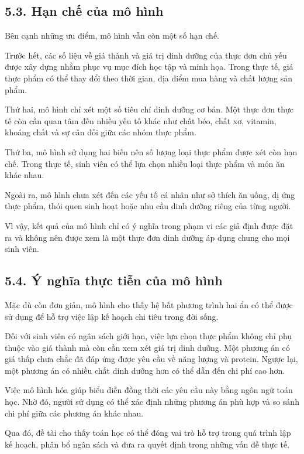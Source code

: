 \documentclass[12pt,a4paper]{article}
\begin{document}
\subsection*{5.3. Hạn chế của mô hình}

Bên cạnh những ưu điểm, mô hình vẫn còn một số hạn chế.

Trước hết, các số liệu về giá thành và giá trị dinh dưỡng của thực đơn
chủ yếu được xây dựng nhằm phục vụ mục đích học tập và minh họa.
Trong thực tế, giá thực phẩm có thể thay đổi theo thời gian, địa điểm
mua hàng và chất lượng sản phẩm.

Thứ hai, mô hình chỉ xét một số tiêu chí dinh dưỡng cơ bản. Một thực
đơn thực tế còn cần quan tâm đến nhiều yếu tố khác như chất béo,
chất xơ, vitamin, khoáng chất và sự cân đối giữa các nhóm thực phẩm.

Thứ ba, mô hình sử dụng hai biến nên số lượng loại thực phẩm được xét
còn hạn chế. Trong thực tế, sinh viên có thể lựa chọn nhiều loại thực
phẩm và món ăn khác nhau.

Ngoài ra, mô hình chưa xét đến các yếu tố cá nhân như sở thích ăn
uống, dị ứng thực phẩm, thói quen sinh hoạt hoặc nhu cầu dinh dưỡng
riêng của từng người.

Vì vậy, kết quả của mô hình chỉ có ý nghĩa trong phạm vi các giả định
được đặt ra và không nên được xem là một thực đơn dinh dưỡng áp dụng
chung cho mọi sinh viên.

\subsection*{5.4. Ý nghĩa thực tiễn của mô hình}

Mặc dù còn đơn giản, mô hình cho thấy hệ bất phương trình hai ẩn có
thể được sử dụng để hỗ trợ việc lập kế hoạch chi tiêu trong đời sống.

Đối với sinh viên có ngân sách giới hạn, việc lựa chọn thực phẩm
không chỉ phụ thuộc vào giá thành mà còn cần xem xét giá trị dinh
dưỡng. Một phương án có giá thấp chưa chắc đã đáp ứng được yêu cầu
về năng lượng và protein. Ngược lại, một phương án có nhiều chất dinh
dưỡng hơn có thể dẫn đến chi phí cao hơn.

Việc mô hình hóa giúp biểu diễn đồng thời các yêu cầu này bằng ngôn
ngữ toán học. Nhờ đó, người sử dụng có thể xác định những phương án
phù hợp và so sánh chi phí giữa các phương án khác nhau.

Qua đó, đề tài cho thấy toán học có thể đóng vai trò hỗ trợ trong quá
trình lập kế hoạch, phân bổ ngân sách và đưa ra quyết định trong
những vấn đề thực tế.
\end{document}
